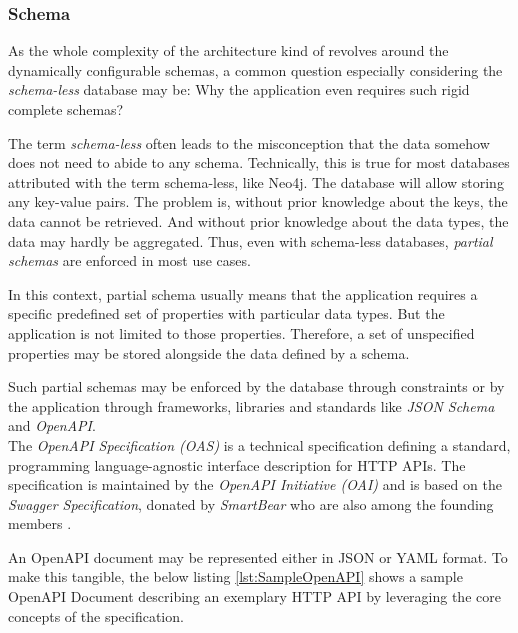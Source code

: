 \subsubsection{Schema}
As the whole complexity of the architecture kind of revolves around the dynamically configurable schemas, a common question especially considering the \emph{schema-less} database may be: Why the application even requires such rigid complete schemas?\par
The term \textit{schema-less} often leads to the misconception that the data somehow does not need to abide to any schema. Technically, this is true for most databases attributed with the term schema-less, like Neo4j. The database will allow storing any key-value pairs. The problem is, without prior knowledge about the keys, the data cannot be retrieved. And without prior knowledge about the data types, the data may hardly be aggregated. Thus, even with schema-less databases, \emph{partial schemas} are enforced in most use cases.\par
In this context, partial schema usually means that the application requires a specific predefined set of properties with particular data types. But the application is not limited to those properties. Therefore, a set of unspecified properties may be stored alongside the data defined by a schema.\par 
Such partial schemas may be enforced by the database through constraints or by the application through frameworks, libraries and standards like \emph{JSON Schema} \cite{JsonSchema} and \emph{OpenAPI}.\\

The \emph{OpenAPI Specification (OAS)} is a technical specification defining a standard, programming language-agnostic interface description for HTTP APIs. The specification is maintained by the \emph{OpenAPI Initiative (OAI)} %
and is based on the \emph{Swagger Specification}, donated by \emph{SmartBear} who are also among the founding members \cite{OpenAPISpec}.\par
An OpenAPI document may be represented either in JSON or YAML format. To make this tangible, the below listing \ref{lst:SampleOpenAPI} shows a sample OpenAPI Document describing an exemplary HTTP API by leveraging the core concepts of the specification.

